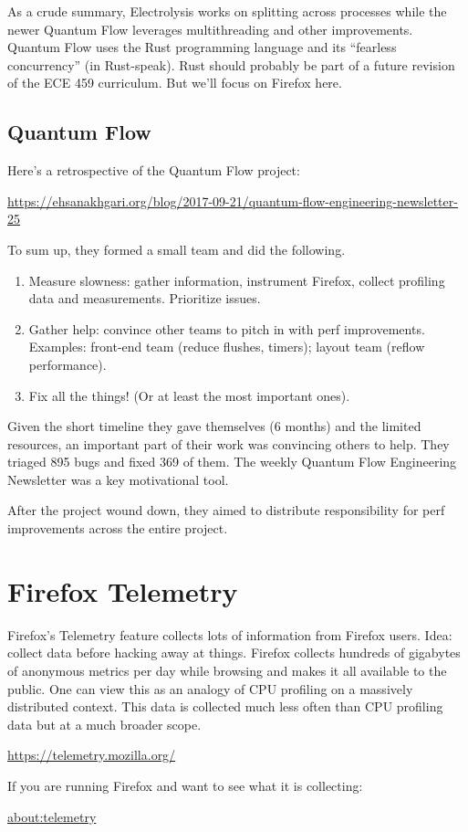 \documentclass[a4paper]{report}
\begin{document}
As a crude summary, Electrolysis works on splitting across processes
while the newer Quantum Flow leverages multithreading and other
improvements.  Quantum Flow uses the Rust programming language and its
``fearless concurrency'' (in Rust-speak). Rust should probably be part
of a future revision of the ECE 459 curriculum. But we'll focus on
Firefox here.

\subsection*{Quantum Flow}
Here's a retrospective of the Quantum Flow project:
\begin{center}
\url{https://ehsanakhgari.org/blog/2017-09-21/quantum-flow-engineering-newsletter-25}
\end{center}

To sum up, they formed a small team and did the following.
\begin{enumerate}[noitemsep]
\item Measure slowness: gather information, instrument Firefox, collect profiling data and measurements. Prioritize issues.
\item Gather help: convince other teams to pitch in with perf improvements. Examples: front-end team (reduce flushes, timers); layout team (reflow performance).
\item Fix all the things! (Or at least the most important ones).
\end{enumerate}
Given the short timeline they gave themselves (6 months) and the limited resources, an important part of their work was convincing others to help.
They triaged 895 bugs and fixed 369 of them. The weekly Quantum Flow Engineering Newsletter was a key motivational tool.

After the project wound down, they aimed to distribute responsibility for perf improvements across the entire project.

\section*{Firefox Telemetry}
Firefox's Telemetry feature collects lots of information from Firefox
users.  Idea: collect data before hacking away at things.  Firefox collects hundreds of
gigabytes of anonymous metrics per day while browsing and makes it all available to
the public.  One can view this as an analogy of CPU profiling on a
massively distributed context. This data is collected much less often than
CPU profiling data but at a much broader scope.
\begin{center}
\url{https://telemetry.mozilla.org/}
\end{center}
If you are running Firefox and want to see what it is collecting:
\begin{center}
\url{about:telemetry}
\end{center}
\end{document}
